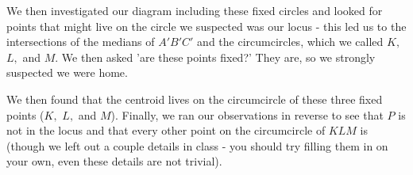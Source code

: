 We then investigated our diagram including these fixed circles and looked for points that might live on the circle we suspected was our locus - this led us to the intersections of the medians of $A'B'C'$ and the circumcircles, which we called $K,$ $L,$ and $M.$  We then asked 'are these points fixed?'  They are, so we strongly suspected we were home.

We then found that the centroid lives on the circumcircle of these three fixed points ($K,$ $L,$ and $M$). Finally, we ran our observations in reverse to see that $P$ is not in the locus and that every other point on the circumcircle of $KLM $ is (though we left out a couple details in class - you should try filling them in on your own, even these details are not trivial).












